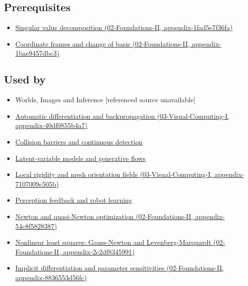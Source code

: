 \subsection{Prerequisites}\label{appendix-29f4bea4c2bb-prerequisites}

\begin{itemize}
\tightlist
\item
  \href{../02-Foundations-II/main.pdf\#nameddest=appendix-1fad5e7f36fa}{Singular value decomposition (02-Foundations-II, appendix-1fad5e7f36fa)}
\item
  \href{../02-Foundations-II/main.pdf\#nameddest=appendix-1bae9457dbc3}{Coordinate frames and change of basis (02-Foundations-II, appendix-1bae9457dbc3)}
\end{itemize}

\subsection{Used by}\label{appendix-29f4bea4c2bb-used-by}

\begin{itemize}
\item
  {Worlds, Images and Inference {[}referenced source unavailable{]}}
\item
  \href{../03-Visual-Computing-I/main.pdf\#nameddest=appendix-40df0855b4a7}{Automatic differentiation and backpropagation (03-Visual-Computing-I, appendix-40df0855b4a7)}
\item
  \hyperref[appendix-a9ba01fa72a6]{Collision barriers and continuous detection}
\item
  \hyperref[appendix-2c568f05ee34]{Latent-variable models and generative flows}
\item
  \href{../03-Visual-Computing-I/main.pdf\#nameddest=appendix-7107009c505b}{Local rigidity and mesh orientation fields (03-Visual-Computing-I, appendix-7107009c505b)}
\item
  \hyperref[appendix-b0c42da325f1]{Perception feedback and robot learning}
\item
  \href{../02-Foundations-II/main.pdf\#nameddest=appendix-54c8f5828387}{Newton and quasi-Newton optimization (02-Foundations-II, appendix-54c8f5828387)}
\item
  \href{../02-Foundations-II/main.pdf\#nameddest=appendix-2c2df8345991}{Nonlinear least squares: Gauss-Newton and Levenberg-Marquardt (02-Foundations-II, appendix-2c2df8345991)}
\item
  \href{../02-Foundations-II/main.pdf\#nameddest=appendix-8836553d56fc}{Implicit differentiation and parameter sensitivities (02-Foundations-II, appendix-8836553d56fc)}
\end{itemize}

